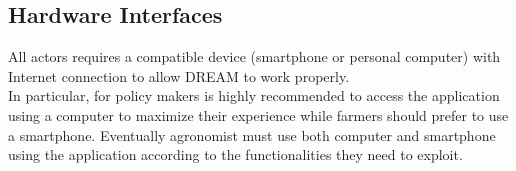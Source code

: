 \subsection{Hardware Interfaces}

All actors requires a compatible device (smartphone or personal computer) with Internet connection to allow DREAM to work properly.\\
In particular, for policy makers is highly recommended to access  the application using a computer to maximize their experience while farmers should prefer to use a smartphone. Eventually agronomist must use both computer and smartphone using the application according to the functionalities they need to exploit.